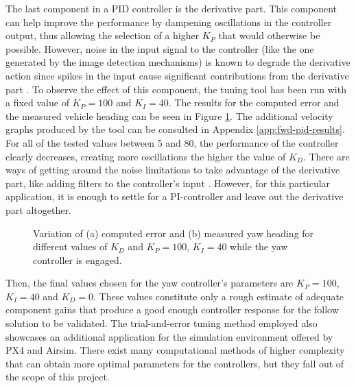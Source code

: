 The last component in a PID controller is the derivative part. This component can help improve the performance by dampening oscillations in the controller output, thus allowing the selection of a higher $K_P$ that would otherwise be possible. However, noise in the input signal to the controller (like the one generated by the image detection mechanisms) is known to degrade the derivative action since spikes in the input cause significant contributions from the derivative part \cite{pid-derivative-noise}. To observe the effect of this component, the tuning tool has been run with a fixed value of $K_P=100$ and $K_I=40$. The results for the computed error and the measured vehicle heading can be seen in Figure \ref{fig:tune-yaw-der}. The additional velocity graphs produced by the tool can be consulted in Appendix \ref{app:fwd-pid-results}. For all of the tested values between 5 and 80, the performance of the controller clearly decreases, creating more oscillations the higher the value of $K_D$. There are ways of getting around the noise limitations to take advantage of the derivative part, like adding filters to the controller's input \cite{pid-derivative-fixes}. However, for this particular application, it is enough to settle for a PI-controller and leave out the derivative part altogether.

\begin{figure}[H]
    \begin{minipage}[t]{0.5\linewidth}
        \centering
        \scalebox{0.55}{}
    \end{minipage}
    \begin{minipage}[t]{0.5\linewidth}
        \centering
        \scalebox{0.55}{}
    \end{minipage}
    \caption{Variation of (a) computed error and (b) measured yaw heading for different values of $K_{D}$ and $K_P=100$, $K_I=40$ while the yaw controller is engaged.}
    \label{fig:tune-yaw-der}
\end{figure}


Then, the final values chosen for the yaw controller's parameters are $K_P=100$, $K_I=40$ and $K_D=0$. These values constitute only a rough estimate of adequate component gains that produce a good enough controller response for the follow solution to be validated. The trial-and-error tuning method employed also showcases an additional application for the simulation environment offered by PX4 and Airsim. There exist many computational methods of higher complexity that can obtain more optimal parameters for the controllers, but they fall out of the scope of this project.

